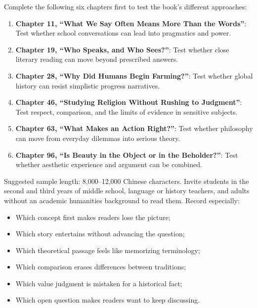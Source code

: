 Complete the following six chapters first to test the book's different approaches:

\begin{enumerate}
\item \textbf{Chapter 11, ``What We Say Often Means More Than the Words''}: Test whether school conversations can lead into pragmatics and power.
\item \textbf{Chapter 19, ``Who Speaks, and Who Sees?''}: Test whether close literary reading can move beyond prescribed answers.
\item \textbf{Chapter 28, ``Why Did Humans Begin Farming?''}: Test whether global history can resist simplistic progress narratives.
\item \textbf{Chapter 46, ``Studying Religion Without Rushing to Judgment''}: Test respect, comparison, and the limits of evidence in sensitive subjects.
\item \textbf{Chapter 63, ``What Makes an Action Right?''}: Test whether philosophy can move from everyday dilemmas into serious theory.
\item \textbf{Chapter 96, ``Is Beauty in the Object or in the Beholder?''}: Test whether aesthetic experience and argument can be combined.
\end{enumerate}
Suggested sample length: 8,000--12,000 Chinese characters. Invite students in the second and third years of middle school, language or history teachers, and adults without an academic humanities background to read them. Record especially:

\begin{itemize}
\item Which concept first makes readers lose the picture;
\item Which story entertains without advancing the question;
\item Which theoretical passage feels like memorizing terminology;
\item Which comparison erases differences between traditions;
\item Which value judgment is mistaken for a historical fact;
\item Which open question makes readers want to keep discussing.
\end{itemize}
